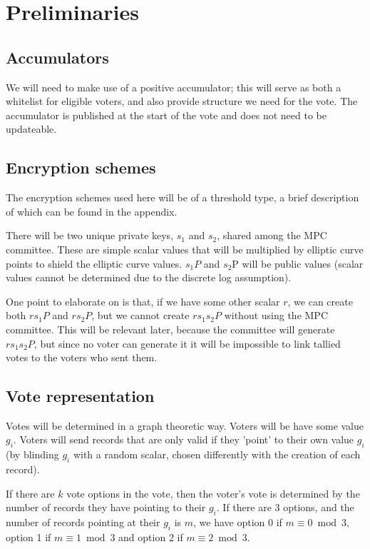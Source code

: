\documentclass{article}
\begin{document}
\section{Preliminaries}
\subsection{Accumulators}
We will need to make use of a positive accumulator; this will serve as both a whitelist for eligible voters, and also provide structure we need for the vote. The accumulator is published at the start of the vote and does not need to be updateable.

\subsection{Encryption schemes}
The encryption schemes used here will be of a threshold type, a brief description of which can be found in the appendix.

There will be two unique private keys, $s_1$ and $s_2$, shared among the MPC committee. These are simple scalar values that will be multiplied by elliptic curve points to shield the elliptic curve values. $s_1P$ and $s_2$P will be public values (scalar values cannot be determined due to the discrete log assumption).

One point to elaborate on is that, if we have some other scalar $r$, we can create both $rs_1P$ and $rs_2P$, but we cannot create $rs_1s_2P$ without using the MPC committee. This will be relevant later, because the committee will generate $rs_1s_2P$, but since no voter can generate it it will be impossible to link tallied votes to the voters who sent them.

\subsection{Vote representation}
Votes will be determined in a graph theoretic way. Voters will be have some value $g_i$. Voters will send records that are only valid if they 'point' to their own value $g_i$ (by blinding $g_i$ with a random scalar, chosen differently with the creation of each record). 

If there are $k$ vote options in the vote, then the voter's vote is determined by the number of records they have pointing to their $g_i$. If there are 3 options, and the number of records pointing at their $g_i$ is $m$, we have option 0 if $m\equiv0\bmod3$, option 1 if $m\equiv1\bmod3$ and option 2 if $m\equiv2\bmod3$.
\end{document}
